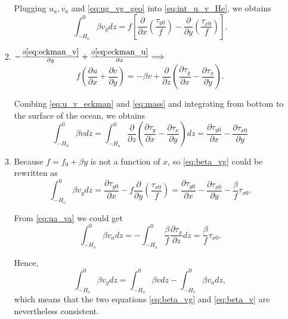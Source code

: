 \documentclass[a4paper]{article}
\begin{document}
\begin{enumerate}[label=\textbf{\arabic*.}]
\begin{enumerate}[label=\textbf{(\alph*)}]
		Plugging $u_a, v_a$ and \eqref{eq:ug_vg_geo} into \eqref{eq:int_u_v_He}, we obtains
		\begin{equation}\label{eq:beta_vg}
			\int _ { - H _ { o } } ^ { 0} \beta  v _ { g } d z =  f\left[ \frac { \partial } { \partial x } \left( \frac { \tau  _ { y 0} } { f } \right) - \frac { \partial } { \partial y } \left( \frac { \tau _ { x0} } { f } \right) \right] .
		\end{equation}
		
		\item $-\frac{\partial \eqref{eq:eckman_v}}{\partial y}+\frac{\partial \eqref{eq:eckman_u}}{\partial x}\Longrightarrow$
		\begin{equation}\label{eq:u_v_eckman}
		f \left( \frac { \partial u  } { \partial x } + \frac { \partial v } { \partial y } \right) = - \beta v+\frac { \partial } {\partial z} \left( \frac{\partial \tau_y}{\partial x} - \frac{\partial \tau_x}{\partial y} \right) .
		\end{equation}
		
		Combing \eqref{eq:u_v_eckman} and \eqref{eq:mass} and integrating from bottom to the surface of the ocean, we obtains
		\begin{equation}\label{eq:beta_v}
			\int _ { - H _ { 0} } ^ { 0} \beta v d z =\int_{ -H_o }^{0}\frac { \partial } {\partial z} \left( \frac{\partial \tau_y}{\partial x} - \frac{\partial \tau_x}{\partial y} \right) dz =\frac{\partial \tau_{y0}}{\partial x} - \frac{\partial \tau_{x0}}{\partial y}
		\end{equation}
	
		\item 
		Because $f=f_0+\beta y$ is not a function of $x$, so \eqref{eq:beta_vg} could be rewritten as
			$$\int _ { - H _ { o } } ^ { 0} \beta  v _ { g } d z =   \frac { \partial \tau_{ y0} } { \partial x } - f\frac { \partial } { \partial y } \left( \frac { \tau _ { x0} } { f } \right) = \frac { \partial \tau_{ y0} } { \partial x }-\frac{\partial \tau_{x0}}{\partial y}-\frac{\beta}{f}\tau_{x0}.$$
			
		From \eqref{eq:ua_va} we could get
		$$\int _ { - H_{ o } } ^ { 0} \beta  v_{a} d z =  - \int _ { - H_{ o } } ^ { 0}  \frac{\beta}{f}\frac{\partial  \tau_{x}}{\partial z} dz = \frac{\beta}{f}\tau_{x0}.$$
		
		
		Hence,
		$$\int _ { - H _ { o } } ^ { 0} \beta  v _ { g } d z =  \int _ { - H _ { o } } ^ { 0} \beta  v d z -\int _ { - H _ { o } } ^ { 0} \beta  v _ { a } d z,$$
		which means that the two equations \eqref{eq:beta_vg} and \eqref{eq:beta_v} are nevertheless consistent.\\
		\end{enumerate}
	

\end{enumerate}
\end{document}

